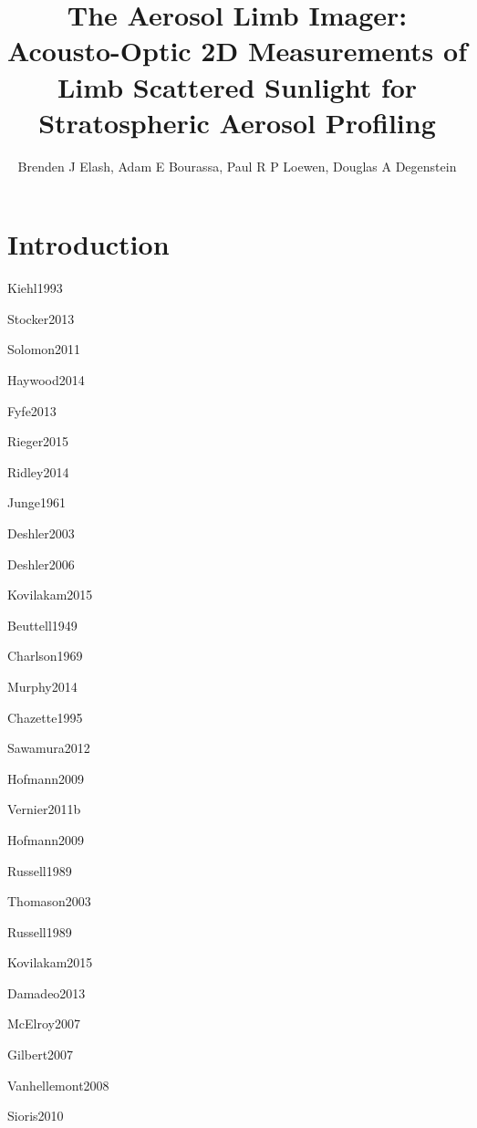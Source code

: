 \documentclass[12pt]{article}
\title{The Aerosol Limb Imager: Acousto-Optic 2D Measurements of Limb Scattered Sunlight for Stratospheric Aerosol Profiling}
\author{Brenden J Elash, Adam E Bourassa, Paul R P Loewen, Douglas A Degenstein}
\begin{document}
\renewcommand\bibname{BiBTex.bib}

\maketitle

\abstract{}

\section{Introduction}
\label{sec:introduction}

Kiehl1993 \citep{Kiehl1993}

Stocker2013 \citep{Stocker2013}

Solomon2011 \citep{Solomon2011}

Haywood2014 \citep{Haywood2014}

Fyfe2013 \citep{Fyfe2013}

Rieger2015 \citep{Rieger2015}

Ridley2014 \citep{Ridley2014}

Junge1961 \citep{Junge1961}

Deshler2003 \citep{Deshler2003}

Deshler2006 \citep{Deshler2006}

Kovilakam2015 \citep{Kovilakam2015}

Beuttell1949 \citep{Beuttell1949}

Charlson1969 \citep{Charlson1969}

Murphy2014 \citep{Murphy2014}

Chazette1995 \citep{Chazette1995}

Sawamura2012 \citep{Sawamura2012}

Hofmann2009 \citep{Hofmann2009}

Vernier2011b \citep{Vernier2011b}

Hofmann2009 \citep{Hofmann2009}

Russell1989 \citep{Russell1989}

Thomason2003 \citep{Thomason2003}

Russell1989 \citep{Russell1989}

Kovilakam2015 \citep{Kovilakam2015}

Damadeo2013 \citep{Damadeo2013}

McElroy2007 \citep{McElroy2007}

Gilbert2007 \citep{Gilbert2007}

Vanhellemont2008 \citep{Vanhellemont2008}

Sioris2010 \citep{Sioris2010}
\end{document}
